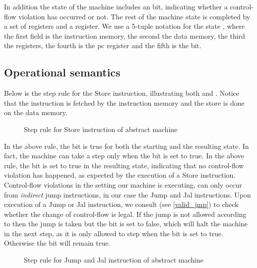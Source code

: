 In addition the state of the machine includes an \ok bit, indicating 
whether a control-flow violation has occurred or not. The rest of the machine
state is completed by a set of registers and a \pc register. We use a 5-tuple
notation for the state \acfistat{\imem}{\dmem}{\reg}{\pc}{\ok}, where the first
field is the instruction memory, the second the data memory, the third the
registers, the fourth is the pc register and the fifth is the \ok bit.

\subsection{Operational semantics}\label{sec:abstract_semantics}
Below is the step rule for the Store instruction, illustrating both \NWC and 
\NXD. Notice that the instruction is fetched by the instruction memory and
the store is done on the data memory.

\begin{figure}[!htb]
\caption{Step rule for Store instruction of abstract machine}
\end{figure}

In the above rule, the \ok bit is true for both the starting and the
resulting state. In fact, the machine can take a step only when the
\ok bit is set to true. In the above rule, the \ok bit is set to true
in the resulting state, indicating that no control-flow violation has
happened, as expected by the execution of a Store
instruction. Control-flow violations in the \NWC setting our machine
is executing, can only occur from \emph{indirect} jump instructions,
in our case the Jump and Jal instructions. Upon execution of a Jump or
Jal instruction, we consult \J (see \cref{valid_jmp}) to check
whether the change of control-flow is legal. If the jump is not
allowed according to \J then the jump is taken but the \ok bit is set
to false, which will halt the machine in the next step, as it is only
allowed to step when the \ok bit is set to true. Otherwise the \ok bit
will remain true.

\begin{figure}[!htpb]
\bigskip

\caption{Step rule for Jump and Jal instruction of abstract machine}
\end{figure}

